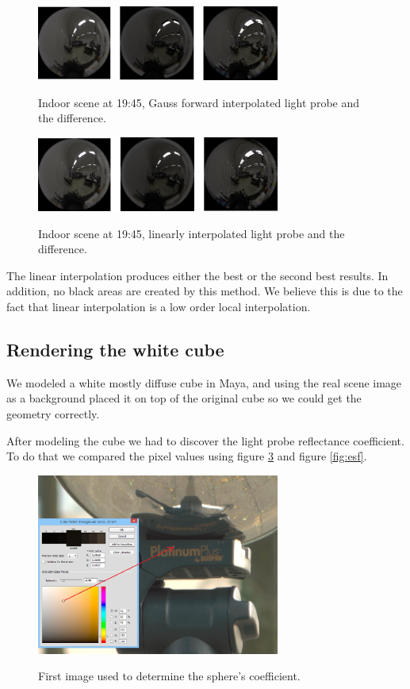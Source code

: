 \documentclass[conference]{acmsiggraph}
\begin{document}
	\begin{figure}[!ht]
		\caption{Indoor scene at 19:45, Gauss forward interpolated light probe and the difference.}
		\centering
		\includegraphics[width=8cm]{images/int1forward.png}
		\label{fig:int1forward}
	\end{figure}

	\begin{figure}[!ht]
		\caption{Indoor scene at 19:45, linearly interpolated light probe and the difference.}
		\centering
		\includegraphics[width=8cm]{images/int1linear.png}
		\label{fig:int1linear}
	\end{figure}

The linear interpolation produces either the best or the second best results. In addition, no black areas are created by this method. We believe this is due to the fact that linear interpolation is a low order local interpolation.


\subsection{Rendering the white cube}

	We modeled a white mostly diffuse cube in Maya, and using the real scene image as a background placed it on top of the original cube so we could get the geometry correctly.

	After modeling the cube we had to discover the light probe reflectance coefficient. To do that we compared the pixel values using figure \ref{fig:base} and figure \ref{fig:esf}.

	\begin{figure}[!ht]
		\centering
		\caption{First image used to determine the sphere’s coefficient.}
		\includegraphics[width=8cm]{images/base.png}
		\label{fig:base}
	\end{figure}
\end{document}

